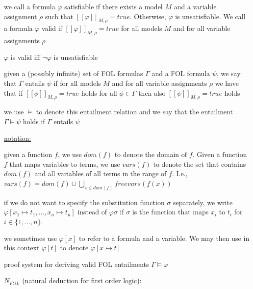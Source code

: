 \documentclass[landscape, a4paper]{article}
\begin{document}
\begin{minipage}[t]{0.2\linewidth}
\begin{betterlist}
		\item we call a formula $\varphi$ \alert{satisfiable} if there exists a model $M$ and a variable assignment $\rho$ such that $[[\varphi]]_{M,\rho} = true$. Otherwise, $\varphi$ is \alert{unsatisfiable}. We call a formula $\varphi$ \alert{valid} if $[[\varphi]]_{M,\rho} = true$ for all models $M$ and for all variable assignments $\rho$
		\begin{betterlist}
			\item $\varphi$ is valid iff $\neg \varphi$ is unsatisfiable
		\end{betterlist}
		\item given a (possibly infinite) set of FOL formulas $\Gamma$ and a FOL formula $\psi$, we say that $\Gamma$ \alert{entails} $\psi$ if for all models $M$ and for all variable assignments $\rho$ we have that if $[[\phi]]_{M,\rho} = true$ holds for all $\phi \in \Gamma$ then also $[[\psi]]_{M,\rho} = true$ holds
		\begin{betterlist}
			\item we use $\models$ to denote this entailment relation and we say that \alert{the entailment $\Gamma \models \psi$ holds} if $\Gamma$ entails $\psi$
		\end{betterlist}
		\item {}
		\item {}
		\begin{betterlist}
			\item \underline{notation:}
			\begin{betterlist}
				\item given a function $f$, we use $dom(f)$ to denote the domain of $f$. Given a function $f$ that maps variables to terms, we use $vars(f)$ to denote the set that contains $dom(f)$ and all variables of all terms in the range of $f$. I.e., $\displaystyle vars(f) = dom(f) \cup \bigcup_{x\in dom(f)} freevars(f(x))$
				\item if we do not want to specify the substitution function $\sigma$ separately, we write $\varphi[x_1 \mapsto t_1, \ldots, x_n \mapsto t_n ]$ instead of $\varphi\sigma$ if $\sigma$ is the function that maps $x_i$ to $t_i$ for $i \in \{1, \ldots , n\}$.
				\item we sometimes use $\varphi[x]$ to refer to a formula and a variable. We may then use in this context $\varphi[t]$ to denote $\varphi[x \mapsto t]$
			\end{betterlist}
		\end{betterlist}
	\end{betterlist}
	\fbox{FOL Proof system ($N_{FOL}$)}
	\begin{betterlist}
		\item proof system for deriving valid FOL entailments $\Gamma \models \varphi$
		\item $N_{FOL}$ (natural deduction for first order logic):


\end{betterlist}
\end{minipage}
\end{document}
